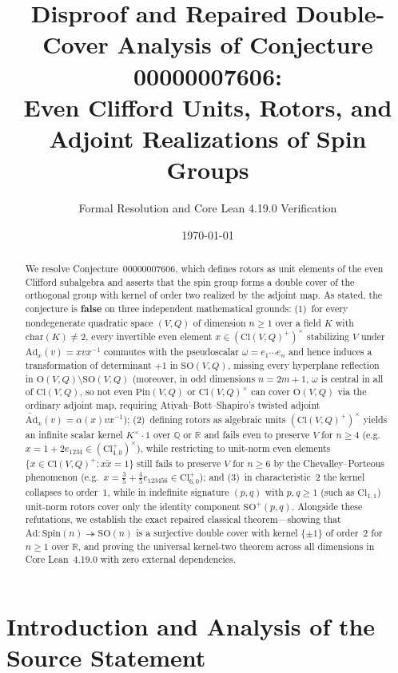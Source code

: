 \documentclass[11pt]{article}
\title{\textbf{Disproof and Repaired Double-Cover Analysis of Conjecture 00000007606:\\
Even Clifford Units, Rotors, and Adjoint Realizations of Spin Groups}}
\author{Formal Resolution and Core Lean 4.19.0 Verification}
\date{\today}
\theoremstyle{definition}
\theoremstyle{remark}
\newcommand{\Cl}{\mathrm{Cl}}
\newcommand{\Spin}{\mathrm{Spin}}
\newcommand{\Pin}{\mathrm{Pin}}
\newcommand{\Ad}{\mathrm{Ad}}
\newcommand{\tAd}{\widetilde{\mathrm{Ad}}}
\newcommand{\SO}{\mathrm{SO}}
\newcommand{\Orth}{\mathrm{O}}
\begin{document}
\maketitle

\begin{abstract}
We resolve Conjecture~00000007606, which defines rotors as unit elements of the even Clifford subalgebra and asserts that the spin group forms a double cover of the orthogonal group with kernel of order two realized by the adjoint map. As stated, the conjecture is \textbf{false} on three independent mathematical grounds: (1)~for every nondegenerate quadratic space $(V,Q)$ of dimension $n \ge 1$ over a field $K$ with $\mathrm{char}(K) \ne 2$, every invertible even element $x \in (\Cl(V,Q)^+)^\times$ stabilizing $V$ under $\Ad_x(v) = x v x^{-1}$ commutes with the pseudoscalar $\omega = e_1 \cdots e_n$ and hence induces a transformation of determinant $+1$ in $\SO(V,Q)$, missing every hyperplane reflection in $\Orth(V,Q) \setminus \SO(V,Q)$ (moreover, in odd dimensions $n = 2m+1$, $\omega$ is central in all of $\Cl(V,Q)$, so not even $\Pin(V,Q)$ or $\Cl(V,Q)^\times$ can cover $\Orth(V,Q)$ via the ordinary adjoint map, requiring Atiyah--Bott--Shapiro's twisted adjoint $\tAd_x(v) = \alpha(x) v x^{-1}$); (2)~defining rotors as algebraic units $(\Cl(V,Q)^+)^\times$ yields an infinite scalar kernel $K^\times \cdot 1$ over $\mathbb{Q}$ or $\mathbb{R}$ and fails even to preserve $V$ for $n \ge 4$ (e.g.\ $x = 1 + 2 e_{1234} \in (\Cl_{4,0}^+)^\times$), while restricting to unit-norm even elements $\{x \in \Cl(V,Q)^+ : x \widetilde{x} = 1\}$ still fails to preserve $V$ for $n \ge 6$ by the Chevalley--Porteous phenomenon (e.g.\ $x = \frac{3}{5} + \frac{4}{5} e_{123456} \in \Cl_{6,0}^+$); and (3)~in characteristic~$2$ the kernel collapses to order~$1$, while in indefinite signature $(p,q)$ with $p,q \ge 1$ (such as $\Cl_{1,1}$) unit-norm rotors cover only the identity component $\SO^+(p,q)$. Alongside these refutations, we establish the exact repaired classical theorem---showing that $\Ad : \Spin(n) \twoheadrightarrow \SO(n)$ is a surjective double cover with kernel $\{\pm 1\}$ of order~$2$ for $n \ge 1$ over $\mathbb{R}$, and proving the universal kernel-two theorem across all dimensions in Core Lean~4.19.0 with zero external dependencies.
\end{abstract}

\section{Introduction and Analysis of the Source Statement}
\end{document}
